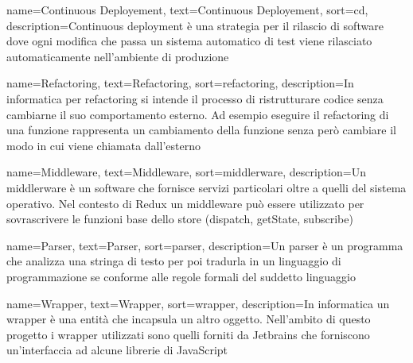 {
	name=Continuous Deployement,
	text=Continuous Deployement,
	sort=cd,
	description={Continuous deployment è una strategia per il rilascio di software dove ogni modifica che passa un sistema automatico di test viene rilasciato automaticamente nell'ambiente di produzione}
}

{
	name=Refactoring,
	text=Refactoring,
	sort=refactoring,
	description={In informatica per refactoring si intende il processo di ristrutturare codice senza cambiarne il suo comportamento esterno. Ad esempio eseguire il refactoring di una funzione rappresenta un cambiamento della funzione senza però cambiare il modo in cui viene chiamata dall'esterno}
}

{
	name=Middleware,
	text=Middleware,
	sort=middlerware,
	description={Un middlerware è un software che fornisce servizi particolari oltre a quelli del sistema operativo. Nel contesto di Redux un middleware può essere utilizzato per sovrascrivere le funzioni base dello store (dispatch, getState, subscribe)}
}

{
	name=Parser,
	text=Parser,
	sort=parser,
	description={Un parser è un programma che analizza una stringa di testo per poi tradurla in un linguaggio di programmazione se conforme alle regole formali del suddetto linguaggio}
}

{
	name=Wrapper,
	text=Wrapper,
	sort=wrapper,
	description={In informatica un wrapper è una entità che incapsula un altro oggetto. Nell'ambito di questo progetto i wrapper utilizzati sono quelli forniti da Jetbrains che forniscono un'interfaccia ad alcune librerie di JavaScript}
}





